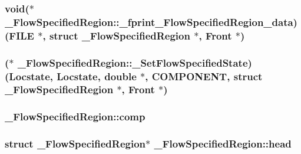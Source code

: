 \subsubsection[{\texorpdfstring{\+\_\+fprint\+\_\+\+Flow\+Specified\+Region\+\_\+data}{_fprint_FlowSpecifiedRegion_data}}]{\setlength{\rightskip}{0pt plus 5cm}void($\ast$ \+\_\+\+Flow\+Specified\+Region\+::\+\_\+fprint\+\_\+\+Flow\+Specified\+Region\+\_\+data) (F\+I\+LE $\ast$, struct {\bf \+\_\+\+Flow\+Specified\+Region} $\ast$, {\bf Front} $\ast$)}\hypertarget{struct___flow_specified_region_abae94c0810c1b47db6793d3afd47cb39}{}\label{struct___flow_specified_region_abae94c0810c1b47db6793d3afd47cb39}
\subsubsection[{\texorpdfstring{\+\_\+\+Set\+Flow\+Specified\+State}{_SetFlowSpecifiedState}}]{($\ast$ \+\_\+\+Flow\+Specified\+Region\+::\+\_\+\+Set\+Flow\+Specified\+State) ({\bf Locstate}, {\bf Locstate}, double $\ast$, {\bf C\+O\+M\+P\+O\+N\+E\+NT}, struct {\bf \+\_\+\+Flow\+Specified\+Region} $\ast$, {\bf Front} $\ast$)}\hypertarget{struct___flow_specified_region_ac64cd108cfd301ac1a19a6d9cc7bb312}{}\label{struct___flow_specified_region_ac64cd108cfd301ac1a19a6d9cc7bb312}
\subsubsection[{\texorpdfstring{comp}{comp}}]{ \+\_\+\+Flow\+Specified\+Region\+::comp}\hypertarget{struct___flow_specified_region_a5fce4f0a8a05cf23a93104d0c7580d00}{}\label{struct___flow_specified_region_a5fce4f0a8a05cf23a93104d0c7580d00}
\subsubsection[{\texorpdfstring{head}{head}}]{\setlength{\rightskip}{0pt plus 5cm}struct {\bf \+\_\+\+Flow\+Specified\+Region}$\ast$ \+\_\+\+Flow\+Specified\+Region\+::head}\hypertarget{struct___flow_specified_region_a5e51bd32d4a24a009f2361bfabe44cf4}{}\label{struct___flow_specified_region_a5e51bd32d4a24a009f2361bfabe44cf4}
